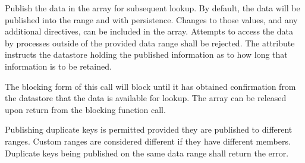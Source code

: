 \optattrend

\descr

Publish the data in the  array for subsequent lookup.
By default, the data will be published into the  range and with  persistence.
Changes to those values, and any additional directives, can be included in the  array. Attempts to access the data by processes outside of the provided data range shall be rejected. The  attribute instructs the datastore holding the published information as to how long that information is to be retained.

The blocking form of this call will block until it has obtained confirmation from the datastore that the data is available for lookup. The  array can be released upon return from the blocking function call.

Publishing duplicate keys is permitted provided they are published to different
ranges. Custom ranges are considered different if they have different members.
Duplicate keys being published on the same data range shall return the
 error.



